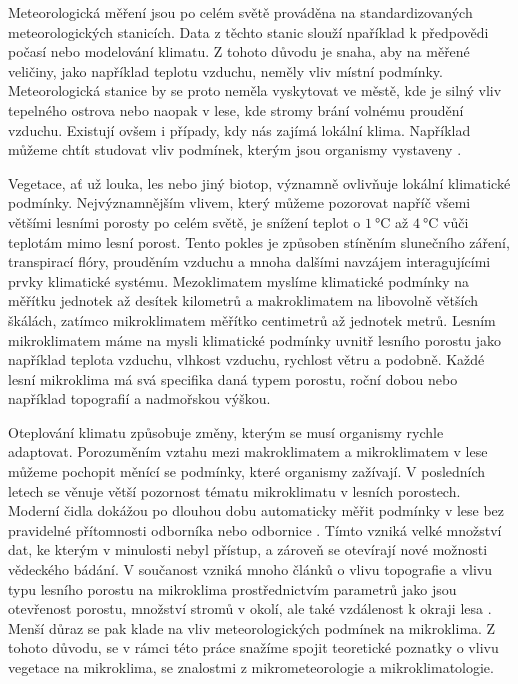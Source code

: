 Meteorologická měření jsou po celém světě prováděna na standardizovaných meteorologických stanicích. Data z těchto stanic slouží npaříklad k předpovědi počasí nebo modelování klimatu. Z tohoto důvodu je snaha, aby na měřené veličiny, jako například teplotu vzduchu, neměly vliv místní podmínky. Meteorologická stanice by se proto neměla vyskytovat ve městě, kde je silný vliv tepelného ostrova nebo naopak v lese, kde stromy brání volnému proudění vzduchu. Existují ovšem i případy, kdy nás zajímá lokální klima. Například můžeme chtít studovat vliv podmínek, kterým jsou organismy vystaveny \parencite{ZellwegerFlorian2019Sdou}.

Vegetace, ať už louka, les nebo jiný biotop, významně ovlivňuje lokální klimatické podmínky. Nejvýznamnějším vlivem, který můžeme pozorovat napříč všemi většími lesními porosty po celém světě, je snížení teplot o $\SI{1}{\celsius}$ až $\SI{4}{\celsius}$ vůči teplotám mimo lesní porost. Tento pokles je způsoben stíněním slunečního záření, transpirací flóry, prouděním vzduchu a mnoha dalšími navzájem interagujícími prvky klimatické systému. Mezoklimatem myslíme klimatické podmínky na měřítku jednotek až desítek kilometrů a makroklimatem na libovolně větších škálách, zatímco mikroklimatem měřítko centimetrů až jednotek metrů. Lesním mikroklimatem máme na mysli klimatické podmínky uvnitř lesního porostu jako například teplota vzduchu, vlhkost vzduchu, rychlost větru a podobně. Každé lesní mikroklima má svá specifika daná typem porostu, roční dobou nebo například topografií a nadmořskou výškou.

Oteplování klimatu způsobuje změny, kterým se musí organismy rychle adaptovat. Porozuměním vztahu mezi makroklimatem a mikroklimatem v lese můžeme pochopit měnící se podmínky, které organismy zažívají. V posledních letech se věnuje větší pozornost tématu mikroklimatu v lesních porostech. Moderní čidla dokážou po dlouhou dobu automaticky měřit podmínky v lese bez pravidelné přítomnosti odborníka nebo odbornice \parencite{WildJan2019Caer}. Tímto vzniká velké množství dat, ke kterým v minulosti nebyl přístup, a zároveň se otevírají nové možnosti vědeckého bádání. V součanost vzniká mnoho článků o vlivu topografie a vlivu typu lesního porostu na mikroklima prostřednictvím parametrů jako jsou otevřenost porostu, množství stromů v okolí, ale také vzdálenost k okraji lesa \parencite{ZellwegerFlorian2019Sdou, predictingforestmicroclimate, snow_deFrenneForestMicroclimates, LindenmayerDavid2022Sard}. Menší důraz se pak klade na vliv meteorologických podmínek na mikroklima. Z tohoto důvodu, se v rámci této práce snažíme spojit teoretické poznatky o vlivu vegetace na mikroklima, se znalostmi z mikrometeorologie a mikroklimatologie.

